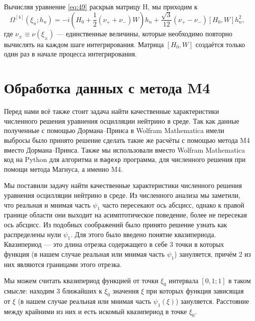 \documentclass[a4paper,12pt]{article}
\begin{document}
	Вычисляя уравнение \eqref{eq:49} раскрыв матрицу H,  мы приходим к
	\begin{equation}
		\Omega^{[4]}(\xi_n;h_n)=-i(H_0 + \frac{1}{2}(\nu_+ + \nu_-)W)h_n +
\frac{\sqrt{3}}{12}(\nu_+ - \nu_-)[H_0, W]h_n^2,
	\end{equation}
	где \(\nu_{\pm} \equiv \nu(\xi_{\pm})\) --- единственные величины, которые необходимо повторно вычислять на каждом шаге интегрирования. Матрица \([H_0,W]\) создаётся только один раз в начале процесса интегрирования.

\newpage
\section{Обработка данных с метода M4}

	Перед нами всё также стоит задача найти качественные характеристики численного решения уравнения осцилляции нейтрино в среде. Так как данные полученные с помощью Дормана--Принса в \textsf{Wolfram Mathematica} имели выбросы было принято решение сделать такие же расчёты с помощью метода M4 вместо Дормана--Принса. Также мы использовали вместо \textsf{Wolfram Mathematica} код на \textsf{Python} для алгоритма и \texttt{magexp} программа, для численного решения при помощи метода Магнуса, а именно M4.

Мы поставили задачу найти качественные характеристики численного решения уравнения осцилляции нейтрино в среде. Из численного анализа мы заметили, что реальная и мнимая часть \(\psi_1\) часто пересекают ось абсцисс, однако к правой границе области они выходит на асимптотическое поведение, более не пересекая ось абсцисс. Из подобных соображений было принято решение узнать как распределены нули \(\psi_{1}\). Для этого было введено понятие квазипериода. Квазипериод --- это длина отрезка содержащего в себе 3 точки в которых функция  (в нашем случае реальная или мнимая часть \(\psi_1\)) зануляется, причём 2 из них являются границами этого отрезка.

Мы можем считать квазипериод функцией от точки \(\xi_0\) интервала \([0,1 ; 1]\) в таком смысле: находим 3 ближайших к \(\xi_0\) значения \(\xi\) при которых функция зависящая от \(\xi\) (в нашем случае реальная или мнимая часть \(\psi_1(\xi)\)) зануляется. Расстояние между крайними из них и есть искомый квазипериод в точке \(\xi_0\).
\end{document}
